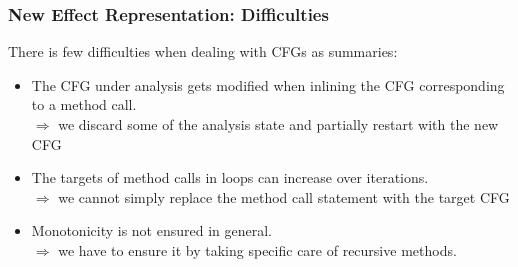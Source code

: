 \documentclass[hyperref={pdfpagelabels=false}]{beamer}
\begin{document}
\begin{frame}[fragile]

%
%
%
%


\frametitle{New Effect Representation: Difficulties}
    There is few difficulties when dealing with CFGs as summaries:
    \begin{itemize}
        \item The CFG under analysis gets modified when inlining the CFG
        corresponding to a method call.\\
            $\Rightarrow$ we discard some of the analysis state and partially restart with the new CFG

        \item The targets of method calls in loops can increase over iterations.\\
            $\Rightarrow$ we cannot simply replace the method call statement with the target CFG

        \item Monotonicity is not ensured in general.\\
            $\Rightarrow$ we have to ensure it by taking specific care of
            recursive methods.
    \end{itemize}
\end{frame}
\end{document}
